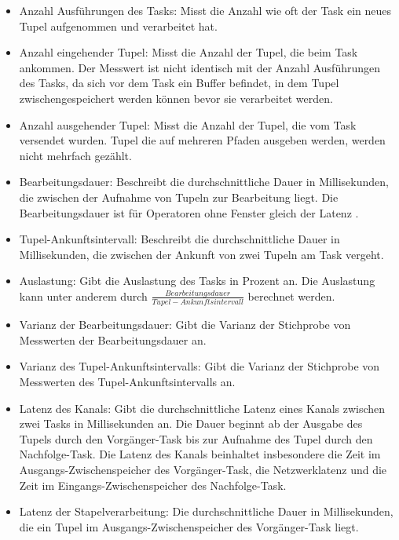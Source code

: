 \begin{itemize}
{Anschließend wird das nächste Tupel aufgenommen.}
\item{Anzahl Ausführungen des Tasks: Misst die Anzahl wie oft der Task ein neues Tupel aufgenommen und verarbeitet hat.}
\item{Anzahl eingehender Tupel: Misst die Anzahl der Tupel, die beim Task ankommen. Der Messwert ist nicht identisch mit der Anzahl Ausführungen des Tasks, da sich vor dem Task ein Buffer befindet, in dem Tupel zwischengespeichert werden können bevor sie verarbeitet werden.}
\item{Anzahl ausgehender Tupel: Misst die Anzahl der Tupel, die vom Task versendet wurden. Tupel die auf mehreren Pfaden ausgeben werden, werden nicht mehrfach gezählt.}
\item{Bearbeitungsdauer: Beschreibt die durchschnittliche Dauer in Millisekunden, die zwischen der Aufnahme von Tupeln zur Bearbeitung liegt. 
Die Bearbeitungsdauer ist für Operatoren ohne Fenster gleich der Latenz \cite{lohrmann_elastic_2015}.}
\item{Tupel-Ankunftsintervall: Beschreibt die durchschnittliche Dauer in Millisekunden, die zwischen der Ankunft von zwei Tupeln am Task vergeht.}
\item{Auslastung: Gibt die Auslastung des Tasks in Prozent an. Die Auslastung kann unter anderem durch \(\frac{Bearbeitungsdauer}{Tupel-Ankunftsintervall}\) berechnet werden.}
\item{Varianz der Bearbeitungsdauer: Gibt die Varianz der Stichprobe von Messwerten der Bearbeitungsdauer an.}
\item{Varianz des Tupel-Ankunftsintervalls: Gibt die Varianz der Stichprobe von Messwerten des Tupel-Ankunftsintervalls an.}
\item{Latenz des Kanals: Gibt die durchschnittliche Latenz eines Kanals zwischen zwei Tasks in Millisekunden an. 
Die Dauer beginnt ab der Ausgabe des Tupels durch den Vorgänger-Task bis zur Aufnahme des Tupel durch den Nachfolge-Task.
Die Latenz des Kanals beinhaltet insbesondere die Zeit im Ausgangs-Zwischenspeicher des Vorgänger-Task, die Netzwerklatenz und die Zeit im Eingangs-Zwischenspeicher des Nachfolge-Task.}
\item{Latenz der Stapelverarbeitung: Die durchschnittliche Dauer in Millisekunden, die ein Tupel im Ausgangs-Zwischenspeicher des Vorgänger-Task liegt.}
\end{itemize}